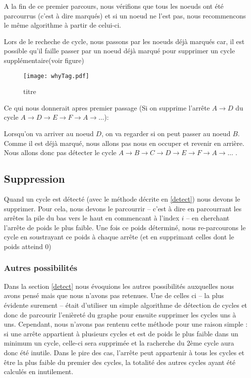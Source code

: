 \documentclass[12pt, oneside]{article}
\begin{document}
A la fin de ce premier parcours, nous vérifions que tous les noeuds ont été parcourrus (c'est à dire marqués) et si un noeud ne l'est pas, nous recommencons le même algorithme à partir de celui-ci.

Lors de le recheche de cycle, nous passons par les noeuds déjà marqués car, il est possible qu'il faille passer par un noeud déjà marqué pour supprimer un cycle supplémentaire(voir figure)

\begin{figure}[h]
   \caption{\label{étiquette} titre}
   \texttt{[image: whyTag.pdf]}
\end{figure}

Ce qui nous donnerait apres premier passage (Si on supprime l'arrête $A \rightarrow D$ du cycle $A \rightarrow D \rightarrow E \rightarrow F \rightarrow A \rightarrow\ldots$):

Lorsqu'on va arriver au noeud $D$, on va regarder si on peut passer au noeud $B$. Comme il est déjà marqué, nous allons pas nous en occuper et revenir en arrière. Nous allons donc pas détecter le cycle $A \rightarrow B \rightarrow C \rightarrow D \rightarrow E \rightarrow F \rightarrow A \rightarrow\ldots$  .

\subsection{Suppression}
\label{del}

Quand un cycle est détecté (avec le méthode décrite en \ref{detect}) nous devons le supprimer. Pour cela, nous devons le parcourrir -- c'est à dire en parcourrant les arrêtes la pile du bas vers le haut en commencant à l'index $i$ -- en cherchant l'arrête de poids le plus faible. Une fois ce poids déterminé, nous re-parcourons le cycle en soustrayant ce poids à chaque arrête (et en supprimant celles dont le poids atteind 0)



\subsubsection{Autres possibilités}
\label{others}

Dans la section \ref{detect} nous évoquions les autres possibilités auxquelles nous avons pensé mais que nous n'avons pas retenues. Une de celles ci -- la plus évidente surement -- était d'utiliser un simple algorithme de détection de cycles et donc de parcourir l'enièreté du graphe pour ensuite supprimer les cycles uns à uns. Cependant, nous n'avons pas rentenu cette méthode pour une raison simple : si une arrête appartient à plusieurs cycles et est de poids le plus faible dans un minimum un cycle, celle-ci sera supprimée et la racherche du 2ème cycle aura donc été inutile. Dans le pire des cas, l'arrête peut appartenir à tous les cycles et être la plus faible du premier des cycles, la totalité des autres cycles ayant été calculés en inutilement.
\end{document}
